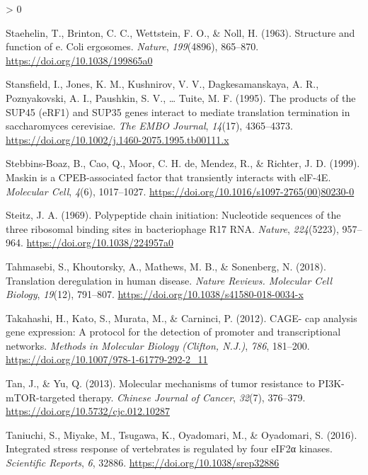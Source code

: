 \documentclass[
  12pt,
  openany]{book}
\newlength{\cslhangindent}
\newenvironment{CSLReferences}[2] %
 {%
  \setlength{\parindent}{0pt}
  \ifodd #1 \everypar{\setlength{\hangindent}{\cslhangindent}}\ignorespaces\fi
  \ifnum #2 > 0
  \setlength{\parskip}{#2\baselineskip}
  \fi
 }%
 {}
\begin{document}
\begin{CSLReferences}{1}{0}
\leavevmode\hypertarget{ref-Staehelin1963}{}%
Staehelin, T., Brinton, C. C., Wettstein, F. O., \& Noll, H. (1963). Structure and function of e. Coli ergosomes. \emph{Nature}, \emph{199}(4896), 865--870. \url{https://doi.org/10.1038/199865a0}

\leavevmode\hypertarget{ref-Stansfield1995}{}%
Stansfield, I., Jones, K. M., Kushnirov, V. V., Dagkesamanskaya, A. R., Poznyakovski, A. I., Paushkin, S. V., \ldots{} Tuite, M. F. (1995). The products of the {SUP}45 ({eRF}1) and {SUP}35 genes interact to mediate translation termination in saccharomyces cerevisiae. \emph{The {EMBO} Journal}, \emph{14}(17), 4365--4373. \url{https://doi.org/10.1002/j.1460-2075.1995.tb00111.x}

\leavevmode\hypertarget{ref-Stebbins-Boaz1999}{}%
Stebbins-Boaz, B., Cao, Q., Moor, C. H. de, Mendez, R., \& Richter, J. D. (1999). Maskin is a {CPEB}-associated factor that transiently interacts with {elF}-4E. \emph{Molecular Cell}, \emph{4}(6), 1017--1027. \url{https://doi.org/10.1016/s1097-2765(00)80230-0}

\leavevmode\hypertarget{ref-Steitz1969}{}%
Steitz, J. A. (1969). Polypeptide chain initiation: Nucleotide sequences of the three ribosomal binding sites in bacteriophage R17 {RNA}. \emph{Nature}, \emph{224}(5223), 957--964. \url{https://doi.org/10.1038/224957a0}

\leavevmode\hypertarget{ref-Tahmasebi2018}{}%
Tahmasebi, S., Khoutorsky, A., Mathews, M. B., \& Sonenberg, N. (2018). Translation deregulation in human disease. \emph{Nature Reviews. Molecular Cell Biology}, \emph{19}(12), 791--807. \url{https://doi.org/10.1038/s41580-018-0034-x}

\leavevmode\hypertarget{ref-Takahashi2012}{}%
Takahashi, H., Kato, S., Murata, M., \& Carninci, P. (2012). {CAGE}- cap analysis gene expression: A protocol for the detection of promoter and transcriptional networks. \emph{Methods in Molecular Biology (Clifton, N.J.)}, \emph{786}, 181--200. \url{https://doi.org/10.1007/978-1-61779-292-2_11}

\leavevmode\hypertarget{ref-Tan2013}{}%
Tan, J., \& Yu, Q. (2013). Molecular mechanisms of tumor resistance to {PI}3K-{mTOR}-targeted therapy. \emph{Chinese Journal of Cancer}, \emph{32}(7), 376--379. \url{https://doi.org/10.5732/cjc.012.10287}

\leavevmode\hypertarget{ref-Taniuchi2016}{}%
Taniuchi, S., Miyake, M., Tsugawa, K., Oyadomari, M., \& Oyadomari, S. (2016). Integrated stress response of vertebrates is regulated by four {eIF}2α kinases. \emph{Scientific Reports}, \emph{6}, 32886. \url{https://doi.org/10.1038/srep32886}


\end{CSLReferences}
\end{document}
